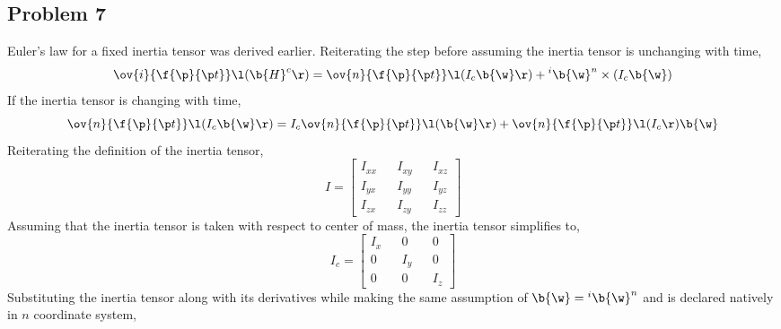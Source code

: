 \documentclass[a4paper, 12pt]{report}
\begin{document}
\begin{center}
\section{Problem 7}
\begin{comment}
\end{comment}
Euler's law for a fixed inertia tensor was derived earlier. Reiterating the step before assuming the inertia tensor is unchanging with time,
$$\ov{i}{\f{\p}{\p t}}\l(\b{H}^c\r) = \ov{n}{\f{\p}{\p t}}\l(I_c \b{\w}\r) + {}^i\b{\w}^n\times (I_c \b{\w})$$
If the inertia tensor is changing with time,
$$\ov{n}{\f{\p}{\p t}}\l(I_c \b{\w}\r) = I_c\ov{n}{\f{\p}{\p t}}\l(\b{\w}\r) + \ov{n}{\f{\p}{\p t}}\l(I_c \r)\b{\w}$$
Reiterating the definition of the inertia tensor,
$$I = \begin{bmatrix}
I_{xx} && I_{xy} && I_{xz} \\
I_{yx} && I_{yy} && I_{yz} \\
I_{zx} && I_{zy} && I_{zz}
\end{bmatrix}$$
Assuming that the inertia tensor is taken with respect to center of mass, the inertia tensor simplifies to,
$$I_c = \begin{bmatrix}
I_x && 0 && 0 \\
0 && I_y && 0 \\
0 && 0 && I_z
\end{bmatrix}$$
Substituting the inertia tensor along with its derivatives while making the same assumption of $\b{\w} = {}^i\b{\w}^n$ and is declared natively in $n$ coordinate system,


\end{center}
\end{document}

